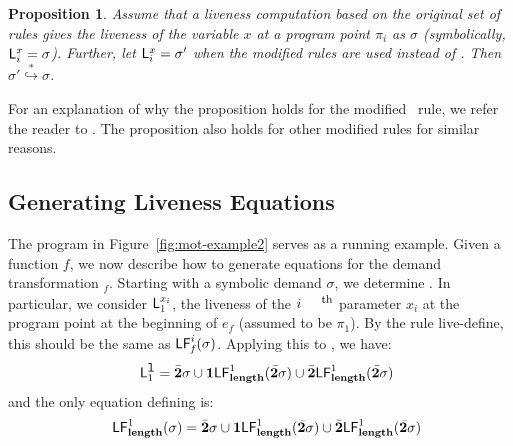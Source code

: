 \documentclass[9pt]{sigplanconf}
\newtheorem{proposition}[theorem]{Proposition}
\begin{document}
\begin{proposition}
Assume that a liveness computation  based on the original set of rules
gives the liveness  of the variable $x$ at a  program point $\pi_i$ as
$\sigma$   (symbolically,   $\mathsf{L}_{{i}}^{x}=   \sigma$).   Further,   let
$\mathsf{L}_{{i}}^{x}=  \sigma'$ when the  modified rules  are used  instead of
\Lfunonly.  Then $\sigma' \stackrel{*}{\hookrightarrow} \sigma$.
\end{proposition}

For  an explanation  of why  the  proposition holds  for the  modified
\CONS\  rule,   we  refer   the  reader  to   \cite{asati14lgc}.   The
proposition also holds for other modified rules for similar reasons.


\newcommand{\emm}[2]{\ensuremath{\mathcal{#1}_{#2}}}

\subsection{Generating Liveness Equations}
The  program  in  Figure~\ref{fig:mot-example2}  serves as  a  running
example.   Given a  function $\mathit{f}$,  we now  describe  how to
generate    equations    for     the    demand    transformation
\Lfonly$_\mathit{f}$.   Starting with a  symbolic demand  $\sigma$, we
determine  .  In  particular, we
consider $\mathsf{L}_{{1}}^{x_i}$,  the  liveness of    the
$i^{\mbox{\footnotesize  th}}$
parameter $x_i$ at the  program point at the  beginning of
$e_{\mathit{f}}$ (assumed  to be  $\pi_1$). By the rule {\sc
  live-define}, this should be the
same as $\mathsf{LF}_{\mathit f}^{i}( {\mathit \sigma})$. Applying this to  \length, we have:
\begin{eqnarray*}
&& \mathsf{L}_{{1}}^{\mbox{\tt l}} = \bar{\mathbf{2}}\sigma \cup \mathbf{1}\mathsf{LF}_{\mathit {\mathbf{length}}}^{1}( {\mathit {\bar{\mathbf{2}}}\sigma})
  \cup \bar{\mathbf{2}}\mathsf{LF}_{\mathit {\mathbf{length}}}^{1}( {\mathit {\bar{\mathbf{2}}}\sigma})
\end{eqnarray*}
and  the only equation defining \Lfone{\length} is:
  \begin{eqnarray*}
   && \mathsf{LF}_{\mathit {\mathbf{length}}}^{1}( {\mathit \sigma})
    =  \bar{\mathbf{2}}\sigma \cup \mathbf{1}\mathsf{LF}_{\mathit {\mathbf{length}}}^{1}( {\mathit {\bar{\mathbf{2}}}\sigma}) \cup \bar{\mathbf{2}}\mathsf{LF}_{\mathit {\mathbf{length}}}^{1}( {\mathit {\bar{\mathbf{2}}}\sigma})
\end{eqnarray*}
\end{document}
